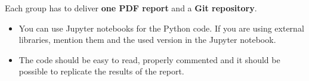 \documentclass[10pt,a4paper,twoside]{article} %
\begin{document}
Each group has to deliver \textbf{one PDF report} and a \textbf{Git repository}. 

\begin{itemize}
    \item You can use Jupyter notebooks for the Python code. If you are using external libraries, mention them and the used version in the Jupyter notebook.
    
    \item The code should be easy to read, properly commented and it should be possible to replicate the results of the report.
    
\end{itemize}


{\small
	
	
}
\end{document}

